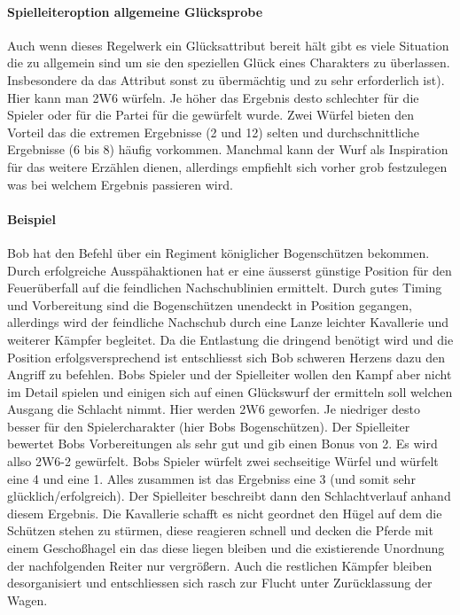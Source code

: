 \documentclass{article}
\begin{document}
\paragraph{Spielleiteroption allgemeine Glücksprobe}

Auch wenn dieses Regelwerk ein Glücksattribut bereit hält gibt es viele Situation die zu allgemein sind um sie
den speziellen Glück eines Charakters zu überlassen. Insbesondere da das Attribut sonst zu übermächtig und zu sehr
erforderlich ist). Hier kann man 2W6 würfeln. Je höher das Ergebnis desto schlechter für die Spieler oder für die
Partei für die gewürfelt wurde. Zwei Würfel bieten den Vorteil das die extremen Ergebnisse (2 und 12) selten und
durchschnittliche Ergebnisse (6 bis 8) häufig vorkommen. Manchmal kann der Wurf als Inspiration für das weitere
Erzählen dienen, allerdings empfiehlt sich vorher grob festzulegen was bei welchem Ergebnis passieren wird.

\paragraph{Beispiel}

Bob hat den Befehl über ein Regiment königlicher Bogenschützen bekommen. Durch erfolgreiche Ausspähaktionen hat er
eine äusserst günstige Position für den Feuerüberfall auf die feindlichen Nachschublinien ermittelt. Durch gutes
Timing und Vorbereitung sind die Bogenschützen unendeckt in Position gegangen, allerdings wird der feindliche
Nachschub durch eine Lanze leichter Kavallerie und weiterer Kämpfer begleitet. Da die Entlastung die dringend
benötigt wird und die Position erfolgsversprechend ist entschliesst sich Bob schweren Herzens dazu den Angriff zu
befehlen.
Bobs Spieler und der Spielleiter wollen den Kampf aber nicht im Detail spielen und einigen sich auf einen Glückswurf
der ermitteln soll welchen Ausgang die Schlacht nimmt. Hier werden 2W6 geworfen. Je niedriger desto besser für den
Spielercharakter (hier Bobs Bogenschützen). Der Spielleiter bewertet Bobs Vorbereitungen als sehr gut und gib einen
Bonus von 2. Es wird allso 2W6-2 gewürfelt. Bobs Spieler würfelt zwei sechseitige Würfel und würfelt eine 4 und
eine 1. Alles zusammen ist das Ergebniss eine 3 (und somit sehr glücklich/erfolgreich). Der Spielleiter beschreibt
dann den Schlachtverlauf anhand diesem Ergebnis. Die Kavallerie schafft es nicht geordnet den Hügel auf dem die
Schützen stehen zu stürmen, diese reagieren schnell und decken die Pferde mit einem Geschoßhagel ein das diese
liegen bleiben und die existierende Unordnung der nachfolgenden Reiter nur vergrößern. Auch die restlichen Kämpfer
bleiben desorganisiert und entschliessen sich rasch zur Flucht unter Zurücklassung der Wagen.
\end{document}
